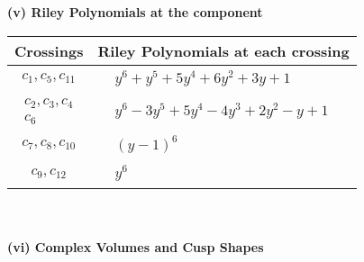\documentclass[1p]{elsarticle_modified}
\theoremstyle{definition}
\begin{document}
\newpage\renewcommand{\arraystretch}{1}
\flushleft \textbf{(v) Riley Polynomials at the component}\newline \\
\begin{tabular}{m{50pt}|m{274pt}}
Crossings & \hspace{64pt}Riley Polynomials at each crossing \\
\hline $$\begin{aligned}c_{1},c_{5},c_{11}\end{aligned}$$&$\begin{aligned}
&y^6+y^5+5 y^4+6 y^2+3 y+1
\end{aligned}$\\
\hline $$\begin{aligned}c_{2},c_{3},c_{4}\\c_{6}\end{aligned}$$&$\begin{aligned}
&y^6-3 y^5+5 y^4-4 y^3+2 y^2- y+1
\end{aligned}$\\
\hline $$\begin{aligned}c_{7},c_{8},c_{10}\end{aligned}$$&$\begin{aligned}
&(y-1)^6
\end{aligned}$\\
\hline $$\begin{aligned}c_{9},c_{12}\end{aligned}$$&$\begin{aligned}
&y^6
\end{aligned}$\\
\hline
\end{tabular}\\~\\
\newpage\flushleft \textbf{(vi) Complex Volumes and Cusp Shapes}
\end{document}
